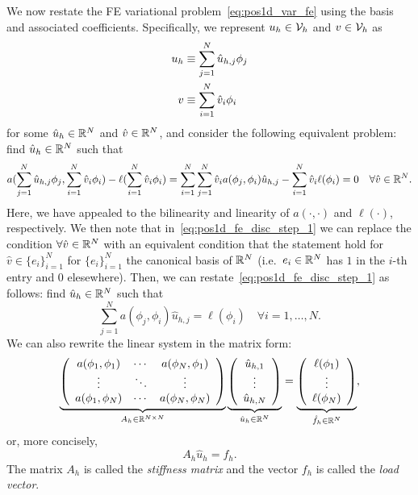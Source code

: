 We now restate the FE variational problem~\eqref{eq:pos1d_var_fe} using the basis and associated coefficients.  Specifically, we represent $u_h \in \calV_h$ and $v \in \calV_h$ as 
\begin{align}
  u_h &\equiv \sum_{j=1}^N \hat u_{h,j} \phi_j \label{eq:pos1d_uh_rep} \\
   v &\equiv \sum_{i=1}^N \hat v_i \phi_i \notag
\end{align}
for some $\hat u_h \in \RR^N$ and $\hat v \in \RR^N$, and consider the following equivalent problem: find $\hat u_h \in \RR^N$ such that
\begin{equation}
  a(\sum_{j=1}^N \hat u_{h,j} \phi_j, \sum_{i=1}^N \hat v_i \phi_i) - \ell(\sum_{i=1}^N \hat v_i \phi_i)
  =
  \sum_{i=1}^N \sum_{j=1}^N \hat v_i a(\phi_j, \phi_i) \hat u_{h,j} -
  \sum_{i=1}^N \hat v_i \ell(\phi_i) = 0 \quad \forall \hat v \in \RR^N.
  \label{eq:pos1d_fe_disc_step_1}
\end{equation}
Here, we have appealed to the bilinearity and linearity of $a(\cdot,\cdot)$ and $\ell(\cdot)$, respectively. We then note that in~\eqref{eq:pos1d_fe_disc_step_1} we can replace the condition $\forall \hat v \in \RR^N$ with an equivalent condition that the statement hold for $\hat v \in \{e_i \}_{i=1}^N$ for $\{e_i\}_{i=1}^N$ the canonical basis of $\RR^N$ (i.e.~$e_i \in \RR^N$ has $1$ in the $i$-th entry and $0$ elesewhere). Then, we can restate~\eqref{eq:pos1d_fe_disc_step_1} as follows: find $\hat u_h \in \RR^N$ such that
\begin{equation}
  \sum_{j=1}^N a(\phi_j,\phi_i) \hat u_{h,j} = \ell(\phi_i) \quad  \forall i = 1,\dots,N.
  \label{eq:pos1d_sys}
\end{equation}
We can also rewrite the linear system in the matrix form:
\begin{equation*}
  \underbrace{ \bmat{ccc}
  a(\phi_1,\phi_1) & \cdots & a(\phi_N,\phi_1) \\
  \vdots & \ddots & \vdots \\
  a(\phi_1,\phi_N) & \cdots & a(\phi_N,\phi_N) \\
  \emat
  }_{A_h \in \RR^{N \times N}}
  \underbrace{ \bmat{c} \hat u_{h,1}  \\ \vdots \\ \hat u_{h,N} \emat }_{\hat u_h \in \RR^N}
  =
  \underbrace{ \bmat{c} \ell(\phi_1) \\ \vdots \\ \ell(\phi_N) \emat }_{\hat f_h \in \RR^N},
\end{equation*}
or, more concisely,
\begin{equation*}
  A_h \hat u_h = f_h.
\end{equation*}
The matrix $A_h$ is called the \emph{stiffness matrix} and the vector $f_h$ is called the \emph{load vector}.%

